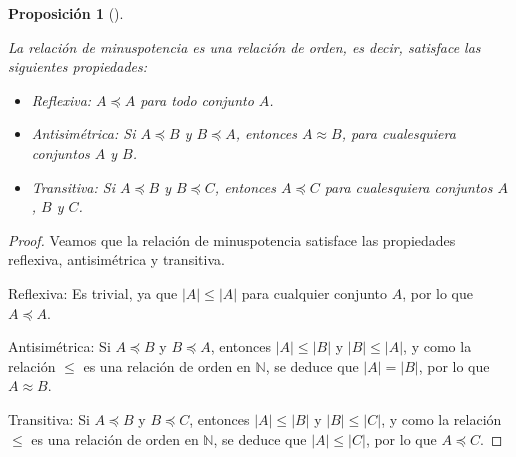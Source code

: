 \documentclass[
  a4paper,
]{scrreport}
\providecommand{\tightlist}{%
  \setlength{\itemsep}{0pt}\setlength{\parskip}{0pt}}\usepackage{longtable,booktabs,array}
\theoremstyle{definition}
\theoremstyle{plain}
\theoremstyle{plain}
\newtheorem{proposition}{Proposición}[chapter]
\theoremstyle{definition}
\theoremstyle{definition}
\theoremstyle{plain}
\theoremstyle{remark}
\begin{document}
\begin{proposition}[]\protect\hypertarget{prp-minuspotencia-relacion-orden}{}\label{prp-minuspotencia-relacion-orden}

La relación de minuspotencia es una relación de orden, es decir,
satisface las siguientes propiedades:

\begin{itemize}
\tightlist
\item
  Reflexiva: \(A\preceq A\) para todo conjunto \(A\).
\item
  Antisimétrica: Si \(A\preceq B\) y \(B\preceq A\), entonces
  \(A\approx B\), para cualesquiera conjuntos \(A\) y \(B\).
\item
  Transitiva: Si \(A\preceq B\) y \(B\preceq C\), entonces
  \(A\preceq C\) para cualesquiera conjuntos \(A\), \(B\) y \(C\).
\end{itemize}

\end{proposition}

\begin{tcolorbox}[enhanced jigsaw, breakable, title=\textcolor{quarto-callout-note-color}{\faInfo}\hspace{0.5em}{Demostración}, toprule=.15mm, coltitle=black, arc=.35mm, rightrule=.15mm, colframe=quarto-callout-note-color-frame, colbacktitle=quarto-callout-note-color!10!white, toptitle=1mm, titlerule=0mm, leftrule=.75mm, opacityback=0, colback=white, bottomrule=.15mm, bottomtitle=1mm, left=2mm, opacitybacktitle=0.6]

\begin{proof}

Veamos que la relación de minuspotencia satisface las propiedades
reflexiva, antisimétrica y transitiva.

Reflexiva: Es trivial, ya que \(|A|\leq |A|\) para cualquier conjunto
\(A\), por lo que \(A\preceq A\).

Antisimétrica: Si \(A\preceq B\) y \(B\preceq A\), entonces
\(|A|\leq |B|\) y \(|B|\leq |A|\), y como la relación \(\leq\) es una
relación de orden en \(\mathbb{N}\), se deduce que \(|A|=|B|\), por lo
que \(A\approx B\).

Transitiva: Si \(A\preceq B\) y \(B\preceq C\), entonces \(|A|\leq |B|\)
y \(|B|\leq |C|\), y como la relación \(\leq\) es una relación de orden
en \(\mathbb{N}\), se deduce que \(|A|\leq |C|\), por lo que
\(A\preceq C\).

\end{proof}

\end{tcolorbox}
\end{document}
